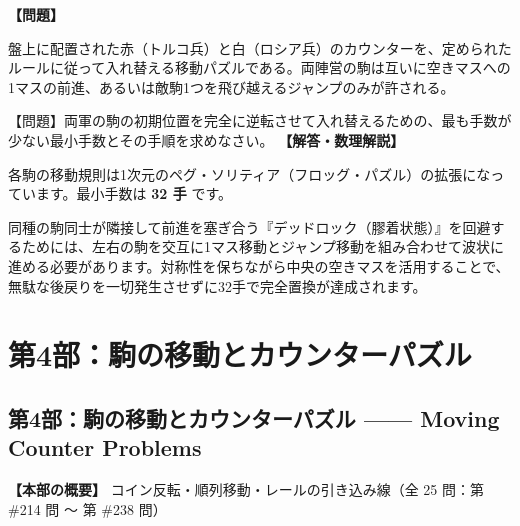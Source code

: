 \documentclass[10pt,a4paper,oneside,openany]{ltjsbook}
\begin{document}
\begin{tcolorbox}[colback=softblue,colframe=primaryblue,title=\textbf{第 213 問：トルコ人とロシア人のカウンターパズル （原題: TURKS AND RUSSIANS.）},arc=2mm,boxrule=1pt,breakable]
\textbf{【問題】}\par\vspace{0.3em}
盤上に配置された赤（トルコ兵）と白（ロシア兵）のカウンターを、定められたルールに従って入れ替える移動パズルである。両陣営の駒は互いに空きマスへの1マスの前進、あるいは敵駒1つを飛び越えるジャンプのみが許される。

【問題】両軍の駒の初期位置を完全に逆転させて入れ替えるための、最も手数が少ない最小手数とその手順を求めなさい。
\tcblower
\textbf{【解答・数理解説】}\par\vspace{0.3em}
各駒の移動規則は1次元のペグ・ソリティア（フロッグ・パズル）の拡張になっています。最小手数は \textbf{32 手} です。

同種の駒同士が隣接して前進を塞ぎ合う『デッドロック（膠着状態）』を回避するためには、左右の駒を交互に1マス移動とジャンプ移動を組み合わせて波状に進める必要があります。対称性を保ちながら中央の空きマスを活用することで、無駄な後戻りを一切発生させずに32手で完全置換が達成されます。
\end{tcolorbox}

\part{第4部：駒の移動とカウンターパズル}
\chapter*{第4部：駒の移動とカウンターパズル —— Moving Counter Problems}

\textbf{【本部の概要】} コイン反転・順列移動・レールの引き込み線（全 25 問：第 \#214 問 〜 第 \#238 問）

\vspace{1em}
\end{document}
